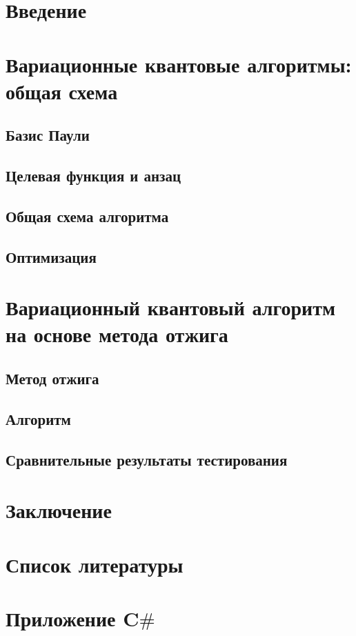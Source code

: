 \documentclass[a4paper]{report}
\begin{document}
\setcounter{page}{2}

\tableofcontents
\newpage

\chapter*{Введение}

\chapter{Вариационные квантовые алгоритмы: общая схема}

\section{Базис Паули}

\section{Целевая функция и анзац}

\section{Общая схема алгоритма}

\section{Оптимизация}

\chapter{Вариационный квантовый алгоритм на основе метода отжига}

\section{Метод отжига}

\section{Алгоритм}

\section{Сравнительные результаты тестирования}

\chapter*{Заключение}

\chapter*{Список литературы}

\chapter*{Приложение {\huge C{$\#$}}}
\end{document}
